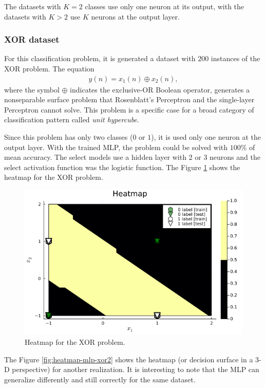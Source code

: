 \documentclass[12pt,a4paper]{article}
\begin{document}
The datasets with \(K=2\) classes use only one neuron at its output, with the datasets with \(K>2\) use \(K\) neurons at the output layer.

\subsubsection{XOR dataset}

For this classification problem, it is generated a dataset with \(200\) instances of the XOR problem. The equation
\begin{align}
    y(n) = x_1 (n) \oplus x_2 (n),
\end{align}
where the symbol \(\oplus\) indicates the exclusive-OR Boolean operator, generates a nonseparable surface problem that Rosenblatt's Perceptron and the single-layer Perceptron cannot solve. This problem is a specific case for a broad category of classification pattern called \emph{unit hypercube}.

Since this problem has only two classes (\(0\) or \(1\)), it is used only one neuron at the output layer. With the trained MLP, the problem could be solved with \(100\%\) of mean accuracy. The select models use a hidden layer with 2 or 3 neurons and the select activation function was the logistic function. The Figure \ref{fig:heatmap-mlp-xor} shows the heatmap for the XOR problem.

\begin{figure}[H]
    \centering
    \includegraphics[scale=0.35]{../trab5 (MLP)/figs/XOR problem - heatmap - nr11.png}
    \caption{Heatmap for the XOR problem.}
    \label{fig:heatmap-mlp-xor}
\end{figure}

The Figure \ref{fig:heatmap-mlp-xor2} shows the heatmap (or decision surface in a 3-D perspective) for another realization. It is interesting to note that the MLP can generalize differently and still correctly for the same dataset.
\end{document}
